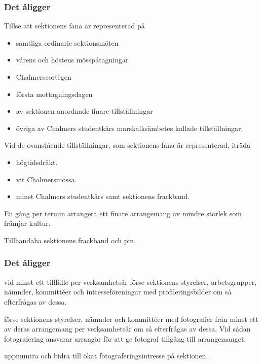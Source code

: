 \subsubsection{Det åligger \FANBARERIT}
\label{sec:fanbarerit:function}
\begin{att}
	\item Tillse att sektionens fana är representerad på
	\begin{itemize}
		\item samtliga ordinarie sektionsmöten
		\item vårens och höstens mösspåtagningar
		\item Chalmerscortègen
		\item första mottagningsdagen
		\item av sektionen anordnade finare tillställningar
		\item övriga av Chalmers studentkårs marskalksämbetes kallade tillställningar.
	\end{itemize}
	\item Vid de ovanstående tillställningar, som sektionens fana är representerad, iträda
	\begin{itemize}
		\item högtidsdräkt.
		\item vit Chalmersmössa.
		\item minst Chalmers studentkårs samt sektionens frackband.
	\end{itemize}
	\item En gång per termin arrangera ett finare arrangemang av mindre storlek som främjar kultur.
	\item Tillhandaha sektionens frackband och pin.
\end{att}

\subsubsection{Det åligger \FLASHIT}
\begin{att}
	\item vid minst ett tillfälle per verksamhetsår förse sektionens styrelser, arbetsgrupper, nämnder, kommittéer och intresseföreningar med profileringsbilder om så efterfrågas av dessa.
	\item förse sektionens styrelser, nämnder och kommittéer med fotografier från minst ett av deras arrangemang per verksamhetsår om så efterfrågas av dessa. Vid sådan fotografering ansvarar arrangör för att ge fotograf tillgång till arrangemanget.
	\item uppmuntra och bidra till ökat fotograferingsintresse på sektionen.
\end{att}


